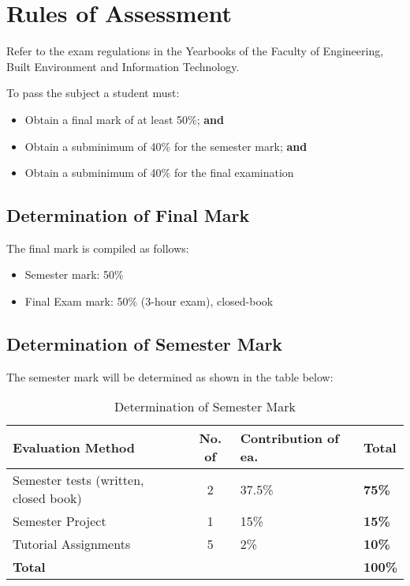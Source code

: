 \section{Rules of Assessment}
    Refer to the exam regulations in the Yearbooks of the Faculty of Engineering,
    Built Environment and Information Technology.

    To pass the subject a student must:
    \begin{itemize}
        \item Obtain a final mark of at least 50\%; {\bf and}
        \item Obtain a subminimum of 40\% for the semester mark; {\bf and}
        \item Obtain a subminimum of 40\% for the final examination
    \end{itemize}

    \subsection{Determination of Final Mark}
        The final mark is compiled as follows:
        \begin{itemize}
            \item Semester mark: 50\%
            \item Final Exam mark: 50\% (3-hour exam), closed-book
        \end{itemize}

    \subsection{Determination of Semester Mark}
        The semester mark will be determined as shown in the table below:
        \begin{table}[!h]
            \begin{center}
             \begin{tabular}{|p{5cm}|c|l|l|}
                 \hline
                 {\bf Evaluation Method} & {\bf No. of} &
                 {\bf Contribution of ea.} & {\bf Total} \\
                 \hline
                 Semester tests (written, closed book)
                    & 2 & 37.5\% & {\bf 75\%} \\ \hline
                 Semester Project
                    & 1 & 15\% & {\bf 15\%} \\ \hline
                 Tutorial Assignments
                    & 5 &  2\% & {\bf 10\%} \\
                 \hline
                 \multicolumn{3}{|l|}{{\bf Total}} & {\bf 100\%} \\
                 \hline
             \end{tabular}
             \caption{Determination of Semester Mark}
            \end{center}
        \end{table}

